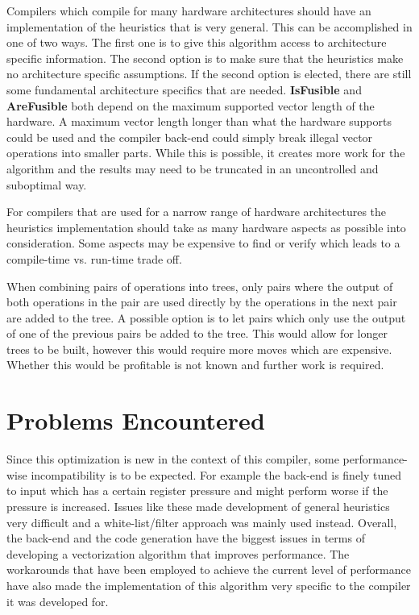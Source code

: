 \documentclass[12pt,a4paper,onecolumn,twoside,openright]{report}
\begin{document}
Compilers which compile for many hardware architectures should have an implementation of the heuristics that is very general. This can be accomplished in one of two ways. The first one is to give this algorithm access to architecture specific information. The second option is to make sure that the heuristics make no architecture specific assumptions. If the second option is elected, there are still some fundamental architecture specifics that are needed. \textbf{IsFusible} and \textbf{AreFusible} both depend on the maximum supported vector length of the hardware. A maximum vector length longer than what the hardware supports could be used and the compiler back-end could simply break illegal vector operations into smaller parts. While this is possible, it creates more work for the algorithm and the results may need to be truncated in an uncontrolled and suboptimal way.

For compilers that are used for a narrow range of hardware architectures the heuristics implementation should take as many hardware aspects as possible into consideration. Some aspects may be expensive to find or verify which leads to a compile-time vs. run-time trade off.

When combining pairs of operations into trees, only pairs where the output of both operations in the pair are used directly by the operations in the next pair are added to the tree. A possible option is to let pairs which only use the output of one of the previous pairs be added to the tree. This would allow for longer trees to be built, however this would require more moves which are expensive. Whether this would be profitable is not known and further work is required.


\section{Problems Encountered}

Since this optimization is new in the context of this compiler, some performance-wise incompatibility is to be expected. For example the back-end is finely tuned to input which has a certain register pressure and might perform worse if the pressure is increased. Issues like these made development of general heuristics very difficult and a white-list/filter approach was mainly used instead.
Overall, the back-end and the code generation have the biggest issues in terms of developing a vectorization algorithm that improves performance. The workarounds that have been employed to achieve the current level of performance have also made the implementation of this algorithm very specific to the compiler it was developed for.
\end{document}
